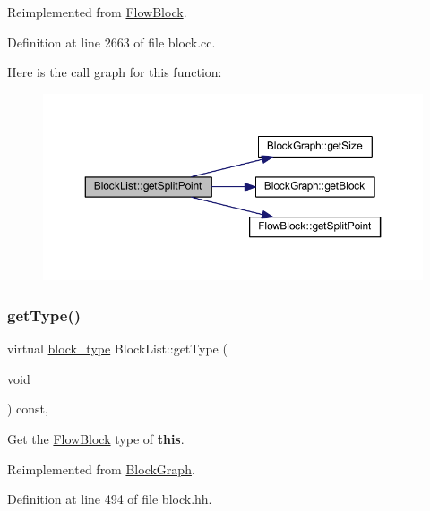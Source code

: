 Reimplemented from \mbox{\hyperlink{class_flow_block_a20996aacbad259e2e4a7bb0c72482335}{Flow\+Block}}.



Definition at line 2663 of file block.\+cc.

Here is the call graph for this function\+:
\nopagebreak
\begin{figure}[H]
\begin{center}
\leavevmode
\includegraphics[width=350pt]{class_block_list_a18e5d3b6de59ea0522dfb1eb96c012c6_cgraph}
\end{center}
\end{figure}
\mbox{\label{class_block_list_ab77ac8f833192e59773b7e3829823dc5}} 
\subsubsection{\texorpdfstring{getType()}{getType()}}
{\footnotesize\ttfamily virtual \mbox{\hyperlink{class_flow_block_a70df78390870fcdd51e31426ba6a193e}{block\+\_\+type}} Block\+List\+::get\+Type (\begin{DoxyParamCaption}\item[{void}]{ }\end{DoxyParamCaption}) const\hspace{0.3cm}{\ttfamily [inline]}, {\ttfamily [virtual]}}



Get the \mbox{\hyperlink{class_flow_block}{Flow\+Block}} type of {\bfseries{this}}. 



Reimplemented from \mbox{\hyperlink{class_block_graph_a8e542e109e0acc977218ceaf3c248153}{Block\+Graph}}.



Definition at line 494 of file block.\+hh.

